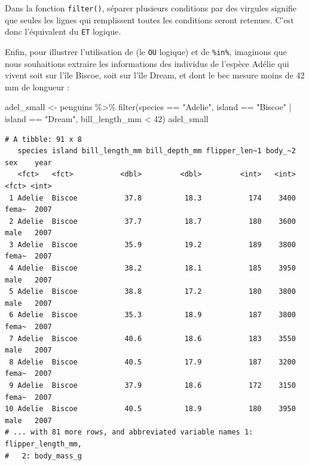 \documentclass[
  letterpaper,
  DIV=11,
  numbers=noendperiod]{scrreprt}
\newenvironment{Shaded}{\begin{snugshade}}{\end{snugshade}}
\newcommand{\DecValTok}[1]{\textcolor[rgb]{0.68,0.00,0.00}{#1}}
\newcommand{\FunctionTok}[1]{\textcolor[rgb]{0.28,0.35,0.67}{#1}}
\newcommand{\NormalTok}[1]{\textcolor[rgb]{0.00,0.23,0.31}{#1}}
\newcommand{\OtherTok}[1]{\textcolor[rgb]{0.00,0.23,0.31}{#1}}
\newcommand{\SpecialCharTok}[1]{\textcolor[rgb]{0.37,0.37,0.37}{#1}}
\newcommand{\StringTok}[1]{\textcolor[rgb]{0.13,0.47,0.30}{#1}}
\begin{document}
Dans la fonction \texttt{filter()}, séparer plusieurs conditions par des
virgules signifie que seules les lignes qui remplissent toutes les
conditions seront retenues. C'est donc l'équivalent du \texttt{ET}
logique.

Enfin, pour illustrer l'utilisation de \texttt{\textbar{}} (le
\texttt{OU} logique) et de \texttt{\%in\%}, imaginons que nous
souhaitions extraire les informations des individus de l'espèce Adélie
qui vivent soit sur l'île Biscoe, soit sur l'île Dream, et dont le bec
mesure moins de 42 mm de longueur :

\begin{Shaded}
\begin{Highlighting}[]
\NormalTok{adel\_small }\OtherTok{\textless{}{-}}\NormalTok{ penguins }\SpecialCharTok{\%\textgreater{}\%} 
  \FunctionTok{filter}\NormalTok{(species }\SpecialCharTok{==} \StringTok{"Adelie"}\NormalTok{, }
\NormalTok{         island }\SpecialCharTok{==} \StringTok{"Biscoe"} \SpecialCharTok{|}\NormalTok{ island }\SpecialCharTok{==} \StringTok{"Dream"}\NormalTok{, }
\NormalTok{         bill\_length\_mm }\SpecialCharTok{\textless{}} \DecValTok{42}\NormalTok{)}
\NormalTok{adel\_small}
\end{Highlighting}
\end{Shaded}

\begin{verbatim}
# A tibble: 91 x 8
   species island bill_length_mm bill_depth_mm flipper_len~1 body_~2 sex    year
   <fct>   <fct>           <dbl>         <dbl>         <int>   <int> <fct> <int>
 1 Adelie  Biscoe           37.8          18.3           174    3400 fema~  2007
 2 Adelie  Biscoe           37.7          18.7           180    3600 male   2007
 3 Adelie  Biscoe           35.9          19.2           189    3800 fema~  2007
 4 Adelie  Biscoe           38.2          18.1           185    3950 male   2007
 5 Adelie  Biscoe           38.8          17.2           180    3800 male   2007
 6 Adelie  Biscoe           35.3          18.9           187    3800 fema~  2007
 7 Adelie  Biscoe           40.6          18.6           183    3550 male   2007
 8 Adelie  Biscoe           40.5          17.9           187    3200 fema~  2007
 9 Adelie  Biscoe           37.9          18.6           172    3150 fema~  2007
10 Adelie  Biscoe           40.5          18.9           180    3950 male   2007
# ... with 81 more rows, and abbreviated variable names 1: flipper_length_mm,
#   2: body_mass_g
\end{verbatim}
\end{document}
